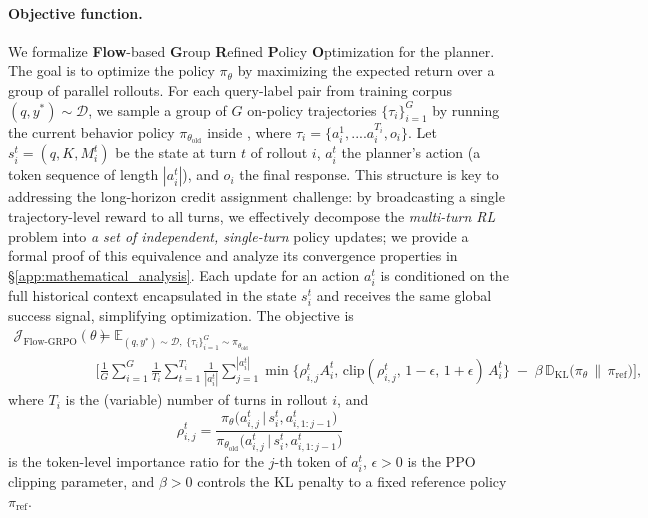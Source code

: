 \paragraph{Objective function.} 
We formalize \textbf{Flow}-based \textbf{G}roup \textbf{R}efined \textbf{P}olicy \textbf{O}ptimization for the planner. The goal is to optimize the policy $\pi_\theta$ by maximizing the expected return over a group of parallel rollouts. For each query-label pair from training corpus $(q,y^*) \sim \mathcal{D}$, we sample a group of $G$ on-policy trajectories $\{\tau_i\}_{i=1}^G$ by running the current behavior policy $\pi_{\theta_\text{old}}$ inside \model, where $\tau_i = \{a_i^1, ....a_i^{T_i}, o_i\}$. Let $s_i^t=(q, K, M_i^t)$ be the state at turn $t$ of rollout $i$, $a_i^t$ the planner’s action (a token sequence of length $|a_i^t|$), and $o_i$ the final response. 
This structure is key to addressing the long-horizon credit assignment challenge: by broadcasting a single trajectory-level reward to all turns, we effectively decompose the \emph{multi-turn RL} problem into \emph{a set of independent, single-turn} policy updates; we provide a formal proof of this equivalence and analyze its convergence properties in \S\ref{app:mathematical_analysis}. Each update for an action $a_i^t$ is conditioned on the full historical context encapsulated in the state $s_i^t$ and receives the same global success signal, simplifying optimization. 
The objective is
{\small
\begin{equation}
    \label{eq:Flow-GRPO_objective}
    \begin{aligned}
    \mathcal{J}_{\text{Flow-GRPO}}(\theta) &= \mathbb{E}_{(q, y^*) \sim \mathcal{D}, \; \{\tau_i\}_{i=1}^{G} \sim \pi_{\theta_\text{old}}}  \\
    & \Bigg[
    \frac{1}{G}\sum_{i=1}^{G}\frac{1}{T_i}\sum_{t=1}^{T_i}\frac{1}{|a_i^t|}\sum_{j=1}^{|a_i^t|}
    \min\!\Big\{ \rho_{i,j}^t A_i^t,\, \mathrm{clip}(\rho_{i,j}^t,\,1-\epsilon,\,1+\epsilon)\,A_i^t \Big\}
    \;-\; \beta\, \mathbb{D}_{\mathrm{KL}}\!\big(\pi_\theta \,\|\, \pi_{\text{ref}}\big)
    \Bigg],
    \end{aligned}
\end{equation}
}where $T_i$ is the (variable) number of turns in rollout $i$, and
\begin{equation}
    \label{eq:ratio_def}
    \rho_{i,j}^t
    = \frac{\pi_\theta\!\big(a_{i,j}^t \,\big|\, s_i^t, a_{i,1:j-1}^t\big)}
    {\pi_{\theta_\text{old}}\!\big(a_{i,j}^t \,\big|\, s_i^t, a_{i,1:j-1}^t\big)}
\end{equation}
is the token-level importance ratio for the $j$-th token of $a_i^t$, $\epsilon>0$ is the PPO clipping parameter, and $\beta>0$ controls the KL penalty to a fixed reference policy $\pi_{\text{ref}}$.

